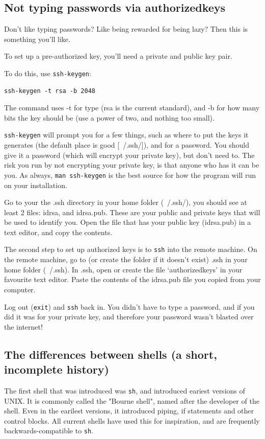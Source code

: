 \subsection{Not typing passwords via authorized\textunderscore keys}
\label{subsection:sshkeys}
Don't like typing passwords? Like being rewarded for being lazy? Then this 
is something you'll like.

To set up a pre-authorized key, you'll need a private and public key pair.

To do this, use {\tt ssh-keygen}:

\begin{verbatim}
ssh-keygen -t rsa -b 2048
\end{verbatim}

The command uses -t for type (rsa 
is the current standard), and -b for how 
many bits the key should be (use a power of two, and nothing too small).

{\tt ssh-keygen} will prompt you for a few things, such as where to put the
keys it generates (the default place is good [~/.ssh/]), and for a password.
You should give it a password (which will encrypt your private key), but don't need to. 
The risk you run by not encrypting your private key, is that anyone who has it
can be you. As always, {\tt man ssh-keygen} is the best source for how the
program will run on your installation.

Go to your the .ssh directory in your home folder (~/.ssh/), you should see at 
least 2 files: id\textunderscore rsa, and id\textunderscore rsa.pub. These are your public and private keys
that will be used to identify you.  Open the file that has your public key (id\textunderscore rsa.pub)
in a text editor, and copy the contents.

The second step to set up authorized keys is to {\tt ssh} into the remote machine.
On the remote machine, go to (or create the folder if it doesn't exist) .ssh 
in your home folder (~/.ssh). In .ssh, open or create the file `authorized\textunderscore keys'
in your favourite text editor.
Paste the contents of the id\textunderscore rsa.pub file you copied from your computer.

Log out ({\tt exit}) and {\tt ssh} back in. You didn't have to type a password, and
if you did it was for your private key, and therefore your password wasn't blasted
over the internet!

\subsection{The differences between shells (a short, incomplete history)}
The first shell that was introduced was {\tt sh}, and introduced eariest versions of UNIX.
It is commonly called the "Bourne shell", named after the developer of the shell.
Even in the earilest versions, it introduced piping, if statements and other control blocks.
All current shells have used this for inspiration, and are frequently backwards-compatible to
 {\tt sh}.

